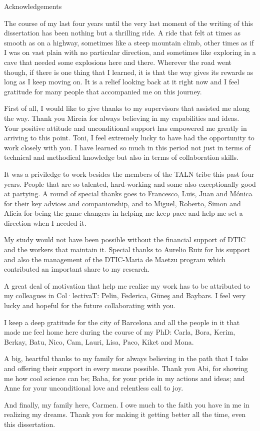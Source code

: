 \vspace{-5mm}
{\Large \sffamily Acknowledgements}
\vspace{3mm}

The course of my last four years until the very last moment of the writing of this dissertation has been nothing but a thrilling ride. 
A ride that felt at times as smooth as on a highway, sometimes like a steep mountain climb, other times as if I was on vast plain with no particular direction, and sometimes like exploring in a cave that needed some explosions here and there. Wherever the road went though, if there is one thing that I learned, it is that the way gives its rewards as long as I keep moving on. It is a relief looking back at it right now and I feel gratitude for many people that accompanied me on this journey. 

First of all, I would like to give thanks to my supervisors that assisted me along the way. Thank you Mireia for always believing in my capabilities and ideas. Your positive attitude and unconditional support has empowered me greatly in arriving to this point. Toni, I feel extremely lucky to have had the opportunity to work closely with you. I have learned so much in this period not just in terms of technical and methodical knowledge but also in terms of collaboration skills.

It was a priviledge to work besides the members of the TALN tribe this past four years. People that are so talented, hard-working and some also exceptionally good at partying. A round of special thanks goes to Francesco, Luis, Juan and Mónica for their key advices and companionship, and to Miguel, Roberto, Simon and Alicia for being the game-changers in helping me keep pace and help me set a direction when I needed it. 

My study would not have been possible without the financial support of DTIC and the workers that maintain it. Special thanks to Aurelio Ruiz for his support and also the management of the DTIC-Maria de Maetzu program which contributed an important share to my research. 

A great deal of motivation that help me realize my work has to be attributed to my colleagues in Col·lectivaT: Pelin, Federica, Güneş and Baybars. I feel very lucky and hopeful for the future collaborating with you.

I keep a deep gratitude for the city of Barcelona and all the people in it that made me feel home here during the course of my PhD: Carla, Bora, Kerim, Berkay, Batu, Nico, Cam, Lauri, Lisa, Paco, Kiket and Mona. 

A big, heartful thanks to my family for always believing in the path that I take and offering their support in every means possible. Thank you Abi, for showing me how cool science can be; Baba, for your pride in my actions and ideas; and Anne for your unconditional love and relentless call to joy.

And finally, my family here, Carmen. I owe much to the faith you have in me in realizing my dreams. Thank you for making it getting better all the time, even this dissertation. 



